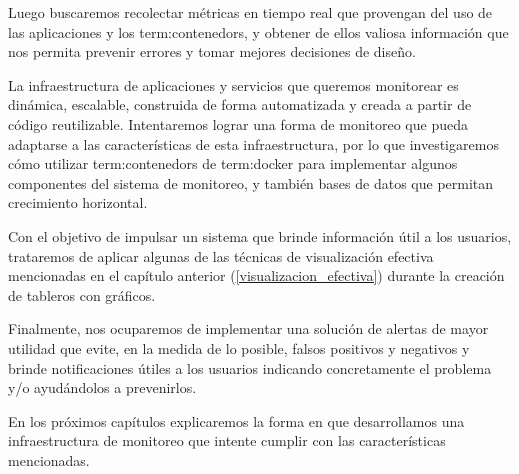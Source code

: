 Luego buscaremos recolectar métricas en tiempo real que provengan del uso de
las aplicaciones y los \glspl{term:contenedor}, y obtener de ellos valiosa
información que nos permita prevenir errores y tomar mejores decisiones de
diseño.

La infraestructura de aplicaciones y servicios que queremos monitorear es
dinámica, escalable, construida de forma automatizada y creada a partir de
código reutilizable. Intentaremos lograr una forma de monitoreo que pueda
adaptarse a las características de esta infraestructura, por lo que
investigaremos cómo utilizar \glspl{term:contenedor} de \gls{term:docker} para
implementar algunos componentes del sistema de monitoreo, y también bases de
datos que permitan crecimiento horizontal.

Con el objetivo de impulsar un sistema que brinde información útil a los
usuarios, trataremos de aplicar algunas de las técnicas de visualización
efectiva mencionadas en el capítulo anterior (\autoref{visualizacion_efectiva})
durante la creación de tableros con gráficos.

Finalmente, nos ocuparemos de implementar una solución de alertas de mayor
utilidad que evite, en la medida de lo posible, falsos positivos y negativos y
brinde notificaciones útiles a los usuarios indicando concretamente el problema
y/o ayudándolos a prevenirlos.

En los próximos capítulos explicaremos la forma en que desarrollamos una
infraestructura de monitoreo que intente cumplir con las características
mencionadas.

